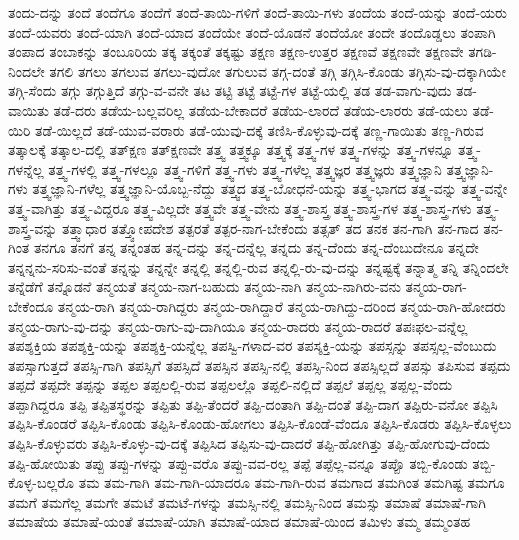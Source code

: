 {ತಂದು-ದನ್ನು
ತಂದೆ
ತಂದೆಗೂ
ತಂದೆಗೆ
ತಂದೆ-ತಾಯಿ-ಗಳಿಗೆ
ತಂದೆ-ತಾಯಿ-ಗಳು
ತಂದೆಯ
ತಂದೆ-ಯನ್ನು
ತಂದೆ-ಯರು
ತಂದೆ-ಯವರು
ತಂದೆ-ಯಾಗಿ
ತಂದೆ-ಯಾದ
ತಂದೆಯೇ
ತಂದೆ-ಯೊಡನೆ
ತಂದೆಯೋ
ತಂದೇ
ತಂದೊಡ್ಡಲು
ತಂಪಾಗಿ
ತಂಪಾದ
ತಂಬಾಕನ್ನು
ತಂಬೂರಿಯ
ತಕ್ಕ
ತಕ್ಕಂತೆ
ತಕ್ಕಷ್ಟು
ತಕ್ಷಣ
ತಕ್ಷಣ-ಉತ್ತರ
ತಕ್ಷಣವೆ
ತಕ್ಷಣವೇ
ತಕ್ಷಣವೇ
ತಗಡಿ-ನಿಂದಲೇ
ತಗಲಿ
ತಗಲು
ತಗಲುವ
ತಗಲು-ವುದೋ
ತಗುಲುವ
ತಗ್ಗ-ದಂತೆ
ತಗ್ಗಿ
ತಗ್ಗಿಸಿ-ಕೊಂಡು
ತಗ್ಗಿಸು-ವು-ದಕ್ಕಾಗಿಯೇ
ತಗ್ಗಿ-ಸೆಂದು
ತಗ್ಗು
ತಗ್ಗುತ್ತಿದೆ
ತಗ್ಗು-ವ-ವನೇ
ತಟ
ತಟ್ಟಿ
ತಟ್ಟೆ
ತಟ್ಟೆ-ಗಳ
ತಟ್ಟೆ-ಯಲ್ಲಿ
ತಡ
ತಡ-ವಾಗು-ವುದು
ತಡ-ವಾಯಿತು
ತಡೆ-ದರು
ತಡೆಯ-ಬಲ್ಲವರಿಲ್ಲ
ತಡೆಯ-ಬೇಕಾದರೆ
ತಡೆಯ-ಲಾರದೆ
ತಡೆಯ-ಲಾರರು
ತಡೆ-ಯಲು
ತಡೆ-ಯಿರಿ
ತಡೆ-ಯಿಲ್ಲದೆ
ತಡೆ-ಯುವ-ವರಾರು
ತಡೆ-ಯುವು-ದಕ್ಕೆ
ತಣಿಸಿ-ಕೊಳ್ಳುವು-ದಕ್ಕೆ
ತಣ್ಣ-ಗಾಯಿತು
ತಣ್ಣ-ಗಿರುವ
ತತ್ಕಾಲಕ್ಕೆ
ತತ್ಕಾಲ-ದಲ್ಲಿ
ತತ್ಕ್ಷಣ
ತತ್ಕ್ಷಣವೇ
ತತ್ತ್ವ
ತತ್ತ್ವಕ್ಕೂ
ತತ್ತ್ವಕ್ಕೆ
ತತ್ತ್ವ-ಗಳ
ತತ್ತ್ವ-ಗಳನ್ನು
ತತ್ತ್ವ-ಗಳನ್ನೂ
ತತ್ತ್ವ-ಗಳನ್ನೆಲ್ಲ
ತತ್ತ್ವ-ಗಳಲ್ಲಿ
ತತ್ತ್ವ-ಗಳಲ್ಲೂ
ತತ್ತ್ವ-ಗಳಿಗೆ
ತತ್ತ್ವ-ಗಳು
ತತ್ತ್ವ-ಗಳೆಲ್ಲ
ತತ್ತ್ವಜ್ಞರ
ತತ್ತ್ವಜ್ಞರು
ತತ್ತ್ವಜ್ಞಾನಿ
ತತ್ತ್ವಜ್ಞಾನಿ-ಗಳು
ತತ್ತ್ವಜ್ಞಾನಿ-ಗಳೆಲ್ಲ
ತತ್ತ್ವಜ್ಞಾನಿ-ಯೊಬ್ಬ-ನೆದ್ದು
ತತ್ತ್ವದ
ತತ್ತ್ವ-ಬೋಧನೆ-ಯನ್ನು
ತತ್ತ್ವ-ಭಾಗದ
ತತ್ತ್ವ-ವನ್ನು
ತತ್ತ್ವ-ವನ್ನೇ
ತತ್ತ್ವ-ವಾಗಿತ್ತು
ತತ್ತ್ವ-ವಿದ್ದರೂ
ತತ್ತ್ವ-ವಿಲ್ಲದೇ
ತತ್ತ್ವವೇ
ತತ್ತ್ವ-ವೇನು
ತತ್ತ್ವ-ಶಾಸ್ತ್ರ
ತತ್ತ್ವ-ಶಾಸ್ತ್ರ-ಗಳ
ತತ್ತ್ವ-ಶಾಸ್ತ್ರ-ಗಳು
ತತ್ತ್ವ-ಶಾಸ್ತ್ರ-ವನ್ನು
ತತ್ತ್ವಾಧಾರ
ತತ್ತ್ವೋಪದೇಶ
ತತ್ಪರತೆ
ತತ್ಪರ-ನಾಗ-ಬೇಕೆಂದು
ತತ್ಸತ್
ತದ
ತನಕ
ತನ-ಗಾಗಿ
ತನ-ಗಾದ
ತನ-ಗಿಂತ
ತನಗೂ
ತನಗೆ
ತನ್ನ
ತನ್ನಂತಹ
ತನ್ನ-ದನ್ನು
ತನ್ನ-ದನ್ನೆಲ್ಲ
ತನ್ನದು
ತನ್ನ-ದೆಂದು
ತನ್ನ-ದೆಂಬುದೇನೂ
ತನ್ನದೇ
ತನ್ನನ್ನನು-ಸರಿಸು-ವಂತೆ
ತನ್ನನ್ನು
ತನ್ನನ್ನೇ
ತನ್ನಲ್ಲಿ
ತನ್ನಲ್ಲಿ-ರುವ
ತನ್ನಲ್ಲಿ-ರು-ವು-ದನ್ನು
ತನ್ನಷ್ಟಕ್ಕೆ
ತನ್ನಾತ್ಮ
ತನ್ನಿ
ತನ್ನಿಂದಲೇ
ತನ್ನೆಡೆಗೆ
ತನ್ನೊಡನೆ
ತನ್ಮಯತೆ
ತನ್ಮಯ-ನಾಗ-ಬಹುದು
ತನ್ಮಯ-ನಾಗಿ
ತನ್ಮಯ-ನಾಗಿರು-ವನು
ತನ್ಮಯ-ರಾಗ-ಬೇಕೆಂದೂ
ತನ್ಮಯ-ರಾಗಿ
ತನ್ಮಯ-ರಾಗಿದ್ದರು
ತನ್ಮಯ-ರಾಗಿದ್ದಾರೆ
ತನ್ಮಯ-ರಾಗಿದ್ದು-ದರಿಂದ
ತನ್ಮಯ-ರಾಗಿ-ಹೋದರು
ತನ್ಮಯ-ರಾಗು-ವು-ದನ್ನು
ತನ್ಮಯ-ರಾಗು-ವು-ದಾಗಿಯೂ
ತನ್ಮಯ-ರಾದರು
ತನ್ಮಯ-ರಾದರೆ
ತಪಃಫಲ-ವನ್ನೆಲ್ಲ
ತಪಶ್ಶಕ್ತಿಯ
ತಪಶ್ಶಕ್ತಿ-ಯನ್ನು
ತಪಶ್ಶಕ್ತಿ-ಯನ್ನೆಲ್ಲ
ತಪಸ್ವಿ-ಗಳಾದ-ವರ
ತಪಸ್ಶಕ್ತಿ-ಯನ್ನು
ತಪಸ್ಸನ್ನು
ತಪಸ್ಸಲ್ಲ-ವೆಂಬುದು
ತಪಸ್ಸಾಗುತ್ತದೆ
ತಪಸ್ಸಿ-ಗಾಗಿ
ತಪಸ್ಸಿಗೆ
ತಪಸ್ಸಿದೆ
ತಪಸ್ಸಿನ
ತಪಸ್ಸಿ-ನಲ್ಲಿ
ತಪಸ್ಸಿ-ನಿಂದ
ತಪಸ್ಸಿಲ್ಲದೆ
ತಪಸ್ಸು
ತಪಿಸುವ
ತಪ್ಪದು
ತಪ್ಪದೆ
ತಪ್ಪದೇ
ತಪ್ಪನ್ನು
ತಪ್ಪಲ
ತಪ್ಪಲಲ್ಲಿ-ರುವ
ತಪ್ಪಲಲ್ಲೊ
ತಪ್ಪಲಿ-ನಲ್ಲಿದೆ
ತಪ್ಪಲೆ
ತಪ್ಪಲ್ಲ
ತಪ್ಪಲ್ಲ-ವೆಂದು
ತಪ್ಪಾಗಿದ್ದರೂ
ತಪ್ಪಿ
ತಪ್ಪಿತಸ್ಥರನ್ನು
ತಪ್ಪಿತು
ತಪ್ಪಿ-ತೆಂದರೆ
ತಪ್ಪಿ-ದಂತಾಗಿ
ತಪ್ಪಿ-ದಂತೆ
ತಪ್ಪಿ-ದಾಗ
ತಪ್ಪಿರು-ವನೋ
ತಪ್ಪಿಸಿ
ತಪ್ಪಿಸಿ-ಕೊಂಡರೆ
ತಪ್ಪಿಸಿ-ಕೊಂಡು
ತಪ್ಪಿಸಿ-ಕೊಂಡು-ಹೋಗಲು
ತಪ್ಪಿಸಿ-ಕೊಂಡೆ-ವೆಂದೂ
ತಪ್ಪಿಸಿ-ಕೊಡರು
ತಪ್ಪಿಸಿ-ಕೊಳ್ಳಲು
ತಪ್ಪಿಸಿ-ಕೊಳ್ಳುವರು
ತಪ್ಪಿಸಿ-ಕೊಳ್ಳು-ವು-ದಕ್ಕೆ
ತಪ್ಪಿಸಿದ
ತಪ್ಪಿಸು-ವು-ದಾದರೆ
ತಪ್ಪಿ-ಹೋಗಿತ್ತು
ತಪ್ಪಿ-ಹೋಗುವು-ದೆಂದು
ತಪ್ಪಿ-ಹೋಯಿತು
ತಪ್ಪು
ತಪ್ಪು-ಗಳನ್ನು
ತಪ್ಪು-ವರೊ
ತಪ್ಪು-ವವ-ರಲ್ಲ
ತಪ್ಪೆ
ತಪ್ಪೆಲ್ಲ-ವನ್ನೂ
ತಪ್ಪೊ
ತಬ್ಬಿ-ಕೊಂಡು
ತಬ್ಬಿ-ಕೊಳ್ಳ-ಬಲ್ಲರೊ
ತಮ
ತಮ-ಗಾಗಿ
ತಮ-ಗಾಗಿ-ಯಾದರೂ
ತಮ-ಗಾಗಿ-ರುವ
ತಮಗಾದ
ತಮಗಿಂತ
ತಮಗಿಷ್ಟ
ತಮಗೂ
ತಮಗೆ
ತಮಗೆಲ್ಲ
ತಮಗೇ
ತಮಟೆ
ತಮಟೆ-ಗಳನ್ನು
ತಮಸ್ಸಿ-ನಲ್ಲಿ
ತಮಸ್ಸಿ-ನಿಂದ
ತಮಸ್ಸು
ತಮಾಷೆ
ತಮಾಷೆ-ಗಾಗಿ
ತಮಾಷೆಯ
ತಮಾಷೆ-ಯಂತೆ
ತಮಾಷೆ-ಯಾಗಿ
ತಮಾಷೆ-ಯಾದ
ತಮಾಷೆ-ಯಿಂದ
ತಮಿಳು
ತಮ್ಮ
ತಮ್ಮಂತಹ
}
